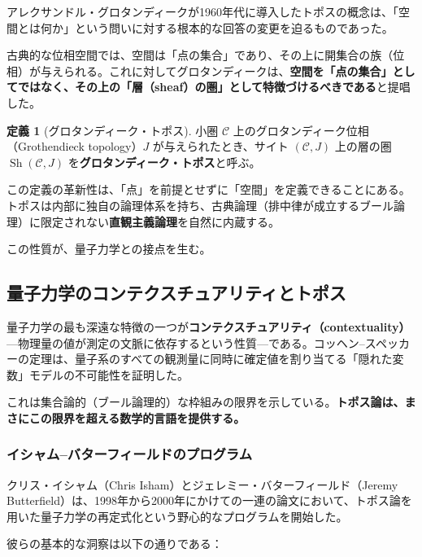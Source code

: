 \documentclass[12pt,a4paper]{ltjsarticle}
\theoremstyle{definition}
\newtheorem{definition}{定義}[section]
\newcommand{\Sh}{\operatorname{Sh}}
\begin{document}
アレクサンドル・グロタンディークが1960年代に導入したトポスの概念\cite{SGA4, Grothendieck1957}は、「空間とは何か」という問いに対する根本的な回答の変更を迫るものであった。

古典的な位相空間では、空間は「点の集合」であり、その上に開集合の族（位相）が与えられる。これに対してグロタンディークは、\textbf{空間を「点の集合」としてではなく、その上の「層（sheaf）の圏」として特徴づけるべきである}と提唱した。

\begin{definition}[グロタンディーク・トポス]
小圏 $\mathcal{C}$ 上のグロタンディーク位相（Grothendieck topology）$J$ が与えられたとき、サイト $(\mathcal{C}, J)$ 上の層の圏 $\Sh(\mathcal{C}, J)$ を\textbf{グロタンディーク・トポス}と呼ぶ。
\end{definition}

この定義の革新性は、「点」を前提とせずに「空間」を定義できることにある。トポスは内部に独自の論理体系を持ち、古典論理（排中律が成立するブール論理）に限定されない\textbf{直観主義論理}を自然に内蔵する\cite{MacLaneMoerdijk1992, Johnstone2002}。

この性質が、量子力学との接点を生む。

\subsection{量子力学のコンテクスチュアリティとトポス}

量子力学の最も深遠な特徴の一つが\textbf{コンテクスチュアリティ（contextuality）}---物理量の値が測定の文脈に依存するという性質---である。コッヘン--スペッカーの定理\cite{KochenSpecker1967}は、量子系のすべての観測量に同時に確定値を割り当てる「隠れた変数」モデルの不可能性を証明した。

これは集合論的（ブール論理的）な枠組みの限界を示している。\textbf{トポス論は、まさにこの限界を超える数学的言語を提供する。}

\subsubsection{イシャム--バターフィールドのプログラム}

クリス・イシャム（Chris Isham）とジェレミー・バターフィールド（Jeremy Butterfield）は、1998年から2000年にかけての一連の論文\cite{IshamButterfield1998, IshamButterfield1999, IshamButterfield2000, IshamButterfield2002}において、トポス論を用いた量子力学の再定式化という野心的なプログラムを開始した。

彼らの基本的な洞察は以下の通りである：
\end{document}
